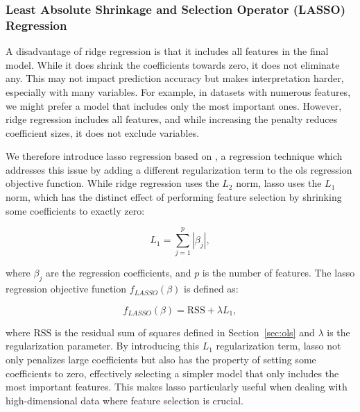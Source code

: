 \subsubsection{Least Absolute Shrinkage and Selection Operator (LASSO) Regression}
A disadvantage of ridge regression is that it includes all features in the final model.
While it does shrink the coefficients towards zero, it does not eliminate any.
This may not impact prediction accuracy but makes interpretation harder, especially with many variables.
For example, in datasets with numerous features, we might prefer a model that includes only the most important ones.
However, ridge regression includes all features, and while increasing the penalty reduces coefficient sizes, it does not exclude variables\cite{James2023AnIS}.

We therefore introduce \gls{lasso} regression based on \citet{James2023AnIS}, a regression technique which addresses this issue by adding a different regularization term to the \gls{ols} regression objective function.
While ridge regression uses the $L_2$ norm, \gls{lasso} uses the $L_1$ norm, which has the distinct effect of performing feature selection by shrinking some coefficients to exactly zero:

$$
L_1 = \sum_{j=1}^{p} |\beta_j|,
$$

where $\beta_j$ are the regression coefficients, and $p$ is the number of features.
The \gls{lasso} regression objective function $f_{LASSO}(\beta)$ is defined as:

$$
f_{LASSO}(\beta) = \text{RSS} + \lambda L_1,
$$

where $\text{RSS}$ is the residual sum of squares defined in Section~\ref{sec:ols} and $\lambda$ is the regularization parameter.
By introducing this $L_1$ regularization term, \gls{lasso} not only penalizes large coefficients but also has the property of setting some coefficients to zero, effectively selecting a simpler model that only includes the most important features.
This makes \gls{lasso} particularly useful when dealing with high-dimensional data where feature selection is crucial.